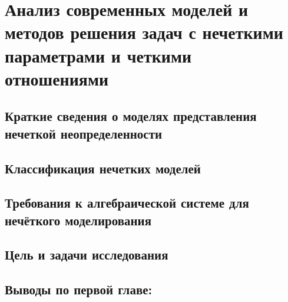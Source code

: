 \chapter{Анализ современных моделей и методов решения задач с нечеткими параметрами и четкими отношениями}
\label{chapter1}

\section{Краткие сведения о моделях представления нечеткой неопределенности}
\label{chapter1_1}


\section{Классификация нечетких моделей} 
\label{chapter1_2}


\section{Требования к алгебраической системе для нечёткого моделирования} 
\label{chapter1_3}


\section{Цель и задачи исследования} 
\label{chapter1_4}


\newpage
\section*{Выводы по первой главе:}
\label{chapter1_5}
